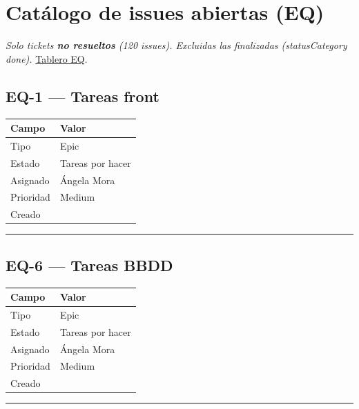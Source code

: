\documentclass[
  spanish,
  11pt,
]{report}
\newcounter{none} %
\begin{document}
\section{Catálogo de issues abiertas
(EQ)}\label{catuxe1logo-de-issues-abiertas-eq}

\emph{Solo tickets \textbf{no resueltos} (120 issues). Excluidas las
finalizadas (statusCategory done).}
\href{https://g-team-ddm5j4dr.atlassian.net/jira/software/projects/EQ}{Tablero
EQ}.

\subsection{EQ-1 --- Tareas front}\label{eq-1-tareas-front}

{\def\LTcaptype{none} %
\begin{longtable}[]{@{}ll@{}}
\toprule\noalign{}
Campo & Valor \\
\midrule\noalign{}
\endhead
\bottomrule\noalign{}
\endlastfoot
Tipo & Epic \\
Estado & Tareas por hacer \\
Asignado & Ángela Mora \\
Prioridad & Medium \\
Creado & \\
\end{longtable}
}

\begin{center}\rule{0.5\linewidth}{0.5pt}\end{center}

\subsection{EQ-6 --- Tareas BBDD}\label{eq-6-tareas-bbdd}

{\def\LTcaptype{none} %
\begin{longtable}[]{@{}ll@{}}
\toprule\noalign{}
Campo & Valor \\
\midrule\noalign{}
\endhead
\bottomrule\noalign{}
\endlastfoot
Tipo & Epic \\
Estado & Tareas por hacer \\
Asignado & Ángela Mora \\
Prioridad & Medium \\
Creado & \\
\end{longtable}
}

\begin{center}\rule{0.5\linewidth}{0.5pt}\end{center}
\end{document}
